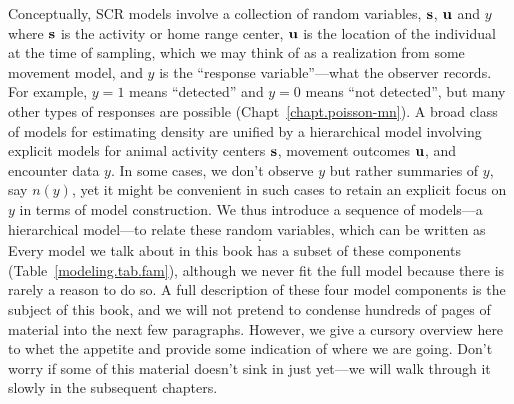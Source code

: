 Conceptually, SCR models involve a collection of random
variables, ${\bf s}$, ${\bf u}$ and $y$ where ${\bf s}$ is the
activity or home range center, ${\bf u}$ is the location of the
individual at the time of sampling,
which we may think of as a realization from some movement
model, and $y$ is the ``response variable''---what the observer
records. For example, $y=1$ means ``detected'' and $y=0$ means ``not
detected'', but many other types of responses are possible
(Chapt~\ref{chapt.poisson-mn}).
A broad class of models for estimating density are unified by a
hierarchical model involving explicit models for
animal activity centers ${\bf s}$, movement outcomes ${\bf u}$, and
encounter data $y$.  In some cases, we don't observe $y$ but rather
summaries of $y$, say $n(y)$, yet it might be convenient in such cases
to retain an explicit focus on $y$ in terms of model construction.
We thus introduce a sequence of models---a hierarchical model---to
relate these random variables, which can be written as
%
\begin{equation}
[n(y)|y][y|{\bf u}][{\bf u}|{\bf s}][{\bf s}].
\label{modeling.eq.nyus}
\end{equation}
Every model we talk about in this book has
a subset of these components (Table~\ref{modeling.tab.fam}), although we never fit the
full model because there is
rarely a reason to do so. A full description of these four model
components is the subject of this book, and we will not pretend to
condense hundreds of pages of material into the next few
paragraphs. However, we give a cursory overview here to whet the appetite and provide some
indication of where we are going. Don't worry if some of this material
doesn't sink in just yet---we will walk through it
slowly in the subsequent chapters.

